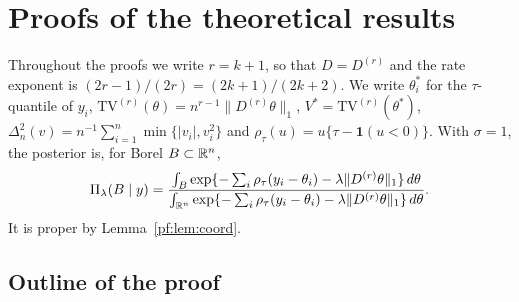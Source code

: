 \providecommand{\pr}{\mathrm{pr}}
\providecommand{\TV}{\mathrm{TV}}
\providecommand{\Dr}{D^{(r)}}
\providecommand{\lamtv}{\lambda_{\TV}}
\providecommand{\thetas}{\theta^{*}}
\providecommand{\en}{\varepsilon_n}
\providecommand{\Lh}{\widehat{\mathcal L}}
\providecommand{\Lm}{\mathcal L}
\providecommand{\Rh}{\widehat{\mathcal R}}
\providecommand{\Ql}{Q_\lambda}
\providecommand{\Pp}{P^{\perp}}
\providecommand{\cP}{\mathcal P}
\providecommand{\fl}{\underline f}
\providecommand{\fu}{\bar f}
\providecommand{\Vb}{\bar V}
\providecommand{\nn}[1]{\|#1\|_n}
\providecommand{\ind}{\mathbf 1}
\providecommand{\op}{\mathrm{op}}

\section{Proofs of the theoretical results}\label{app:proofs}

Throughout the proofs we write $r=k+1$, so that $D=D^{(r)}$ and the rate exponent is $(2r-1)/(2r)=(2k+1)/(2k+2)$. We write $\thetas_i$ for the $\tau$-quantile of $y_i$, $\TV^{(r)}(\theta)=n^{r-1}\|\Dr\theta\|_1$, $V^{*}=\TV^{(r)}(\thetas)$, $\Delta_n^2(v)=n^{-1}\sum_{i=1}^n\min\{|v_i|,v_i^2\}$ and $\rho_\tau(u)=u\{\tau-\ind(u<0)\}$. With $\sigma=1$, the posterior is, for Borel $B\subset\mathbb{R}^n$,
\begin{equation}\label{pf:eq:post}
\Pi_\lambda(B\mid y)=\frac{\int_B\exp\{-\sum_{i}\rho_\tau(y_i-\theta_i)-\lambda\|\Dr\theta\|_1\}\,d\theta}
{\int_{\R^n}\exp\{-\sum_{i}\rho_\tau(y_i-\theta_i)-\lambda\|\Dr\theta\|_1\}\,d\theta}.
\end{equation}
It is proper by Lemma~\ref{pf:lem:coord}.

\subsection{Outline of the proof}

